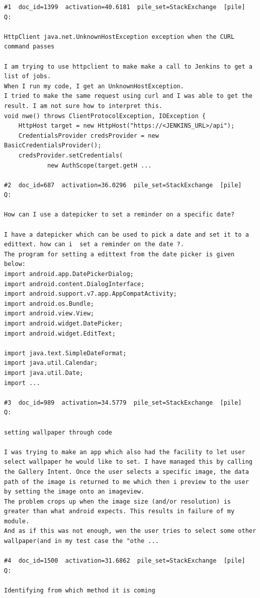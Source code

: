 \begin{verbatim}
#1  doc_id=1399  activation=40.6181  pile_set=StackExchange  [pile]
Q:

HttpClient java.net.UnknownHostException exception when the CURL command passes

I am trying to use httpclient to make make a call to Jenkins to get a list of jobs.
When I run my code, I get an UnknownHostException.
I tried to make the same request using curl and I was able to get the result. I am not sure how to interpret this.
void nwe() throws ClientProtocolException, IOException {
    HttpHost target = new HttpHost("https://<JENKINS_URL>/api");
    CredentialsProvider credsProvider = new BasicCredentialsProvider();
    credsProvider.setCredentials(
            new AuthScope(target.getH ...

#2  doc_id=687  activation=36.0296  pile_set=StackExchange  [pile]
Q:

How can I use a datepicker to set a reminder on a specific date?

I have a datepicker which can be used to pick a date and set it to a edittext. how can i  set a reminder on the date ?.
The program for setting a edittext from the date picker is given below:
import android.app.DatePickerDialog;
import android.content.DialogInterface; 
import android.support.v7.app.AppCompatActivity;
import android.os.Bundle;
import android.view.View;
import android.widget.DatePicker;
import android.widget.EditText;

import java.text.SimpleDateFormat;
import java.util.Calendar;
import java.util.Date;
import ...

#3  doc_id=989  activation=34.5779  pile_set=StackExchange  [pile]
Q:

setting wallpaper through code

I was trying to make an app which also had the facility to let user select wallpaper he would like to set. I have managed this by calling the Gallery Intent. Once the user selects a specific image, the data path of the image is returned to me which then i preview to the user by setting the image onto an imageview.
The problem crops up when the image size (and/or resolution) is greater than what android expects. This results in failure of my module. 
And as if this was not enough, wen the user tries to select some other wallpaper(and in my test case the "othe ...

#4  doc_id=1500  activation=31.6862  pile_set=StackExchange  [pile]
Q:

Identifying from which method it is coming


\end{verbatim}
